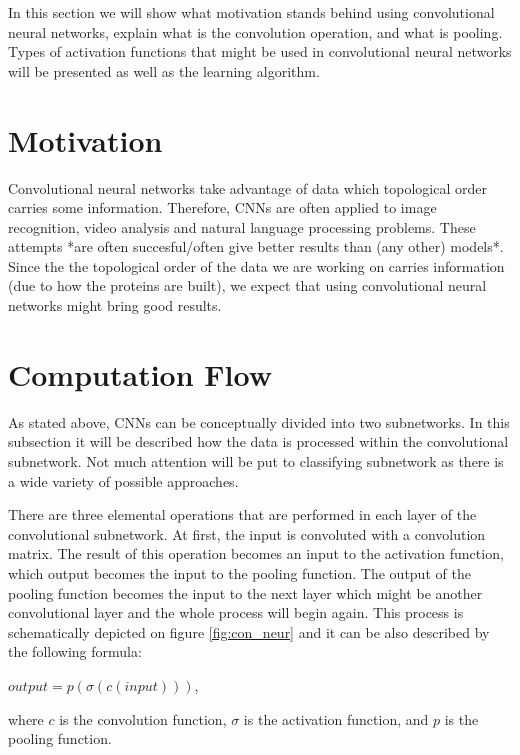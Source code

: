 \documentclass[a4paper,10pt]{report}
\begin{document}
      In this section we will show what motivation stands behind using convolutional neural networks, explain what is the convolution operation, and what is pooling. Types of activation functions that might be used in convolutional neural networks
      will be presented as well as the learning algorithm. 
      
      \section{Motivation}
	Convolutional neural networks take advantage of data which topological order carries some information. Therefore, CNNs are often applied to image recognition, video analysis and natural language processing problems.  %
	These attempts *are often succesful/often give better results than (any other) models*.  %
	Since the the topological order of the data we are working on carries information (due to how the proteins are built), we expect that using convolutional neural networks might bring good results. 
	
      \section{Computation Flow}
	As stated above, CNNs can be conceptually divided into two subnetworks. In this subsection it will be described how the data is processed within the convolutional subnetwork. Not much attention will be put to classifying subnetwork as there is a wide variety of possible approaches. 
	
	There are three elemental operations that are performed in each layer of the convolutional subnetwork. At first, the input is convoluted with a convolution matrix. The result of this operation becomes an input to the activation function, which output becomes the input to the pooling function. The output of the pooling function becomes the input to the next layer which might be another convolutional layer and the whole process will begin again. This process is schematically depicted on figure \ref{fig:con_neur} and it can be also described by the following formula: 
	
	\begin{center}
	$output = p(\sigma(c(input)))$, 
	\end{center}
	
	
	where $c$ is the convolution function, $\sigma$ is the activation function, and $p$ is the pooling function. 
	
\end{document}
